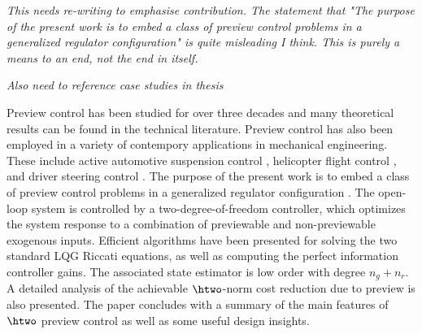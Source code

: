 \label{sec:Conclusions}
\textit{This needs re-writing to emphasise contribution. The statement that "The purpose of the present work
is to embed a class of preview control problems in a generalized regulator
configuration" is quite misleading I think. This is purely a means to an end, not the end in itself. }

\textit{Also need to reference case studies in thesis}

Preview control has been studied for over three decades and many theoretical results can be found in the technical literature. Preview control has also been employed in a variety of contempory applications in mechanical engineering. These include active automotive suspension control \cite{Roh_1999_Stoc_Opt_Prev,Marzbanrad_2004_SuspPrev}, helicopter flight control \cite{Paulino_2006_PreviewRotorcraftAffine}, 
and driver steering control \cite{Cole_2006_PredictiveAndPreviewSteeringControl}. The purpose of the present work is to embed a class of preview control problems in a generalized regulator configuration \cite{LimebeerGreen,ZDG}. The open-loop system is controlled by a two-degree-of-freedom controller, which optimizes the system response to a combination of previewable and non-previewable exogenous inputs. Efficient algorithms have been presented for solving the two standard LQG Riccati equations, as well as computing the perfect information controller gains. The associated state estimator is low order with degree $n_g+n_r$. A detailed analysis of the achievable $\htwo$-norm cost reduction due to preview is also presented. The paper concludes with a summary of the main features of $\htwo$ preview control as well as some useful design insights.



